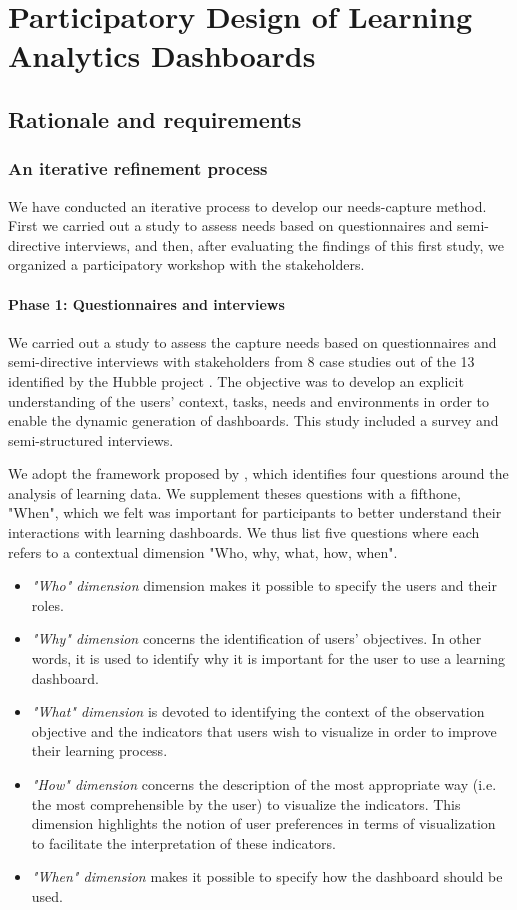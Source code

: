 \documentclass[manuscript,screen,nonacm,12pt]{acmart}
\begin{document}
\section{Participatory Design of Learning Analytics Dashboards}
\subsection{Rationale and requirements}
\subsubsection{An iterative refinement process}
\label{sec:dimensions}
We have conducted an iterative process to develop our needs-capture method. First we carried out a study to assess needs based on questionnaires and semi-directive interviews, and then, after evaluating  the findings of this first study, we organized a participatory workshop with the stakeholders.


\paragraph{Phase 1: Questionnaires and interviews}
We carried out a study to assess the capture needs based on questionnaires and semi-directive interviews with stakeholders from 8 case studies out of the 13 identified by the Hubble project \cite{dabbebi2017towards}. 
The objective was to develop an explicit understanding of the users' context, tasks, needs and environments in order to enable the dynamic generation of dashboards. This study included a survey and semi-structured interviews.

We adopt the framework proposed by \citet{chatti2012reference}, which identifies four questions around the analysis of learning data. We supplement theses questions with a fifthone, "When", which we felt was important for participants to better understand their interactions with learning dashboards. We thus list five questions where each refers to a contextual dimension "Who, why, what, how, when".
\begin{itemize}
    \item \textit{"Who" dimension}  dimension makes it possible to specify the users and their roles.
    \item \textit{"Why" dimension} concerns the identification of users' objectives. In other words, it is used to identify why it is important for the user to use a learning dashboard.
    \item \textit{"What" dimension}  is devoted to identifying the context of the observation objective and the indicators that users wish to visualize in order to improve their learning process.
    \item \textit{"How" dimension}  concerns the description of the most appropriate way (i.e. the most comprehensible by the user) to visualize the indicators. This dimension highlights the notion of user preferences in terms of visualization to facilitate the interpretation of these indicators.
    \item \textit{"When" dimension} makes it possible to specify how the dashboard should be used. 
\end{itemize}
\end{document}
